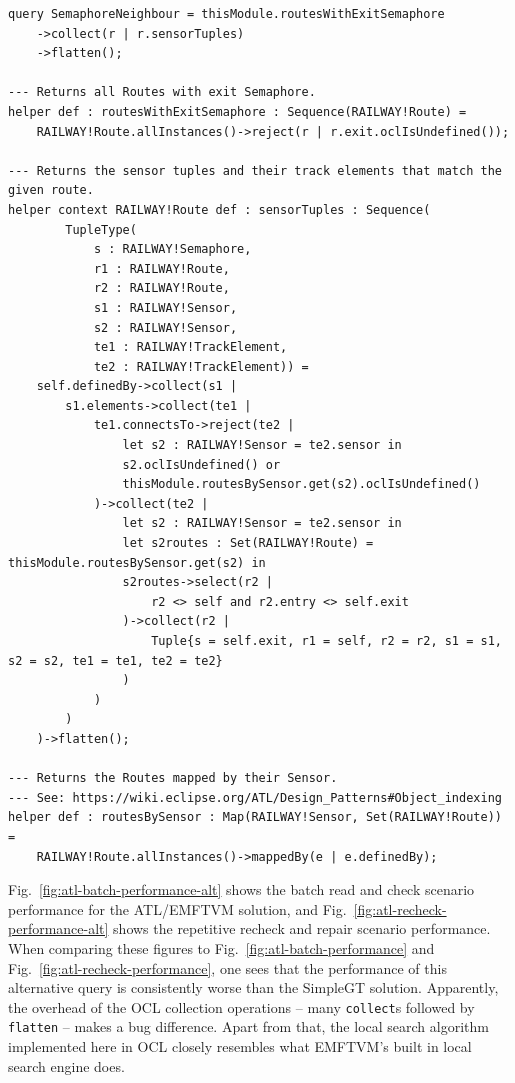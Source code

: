 \documentclass[submission,copyright,creativecommons]{eptcs}
\begin{document}
\lstset{language=atl}
\begin{lstlisting}[float=htb, caption={SemaphoreNeighbor query in ATL}, label=lst:semaphoreneighbor, captionpos=b, frame=tb, belowskip=-10pt]
query SemaphoreNeighbour = thisModule.routesWithExitSemaphore
	->collect(r | r.sensorTuples)
	->flatten();

--- Returns all Routes with exit Semaphore.
helper def : routesWithExitSemaphore : Sequence(RAILWAY!Route) =
	RAILWAY!Route.allInstances()->reject(r | r.exit.oclIsUndefined());

--- Returns the sensor tuples and their track elements that match the given route.
helper context RAILWAY!Route def : sensorTuples : Sequence(
		TupleType(
			s : RAILWAY!Semaphore,
			r1 : RAILWAY!Route,
			r2 : RAILWAY!Route,
			s1 : RAILWAY!Sensor,
			s2 : RAILWAY!Sensor,
			te1 : RAILWAY!TrackElement, 
			te2 : RAILWAY!TrackElement)) =
	self.definedBy->collect(s1 | 
		s1.elements->collect(te1 | 
			te1.connectsTo->reject(te2 | 
				let s2 : RAILWAY!Sensor = te2.sensor in
				s2.oclIsUndefined() or 
				thisModule.routesBySensor.get(s2).oclIsUndefined()
			)->collect(te2 |
				let s2 : RAILWAY!Sensor = te2.sensor in
				let s2routes : Set(RAILWAY!Route) = thisModule.routesBySensor.get(s2) in
				s2routes->select(r2 |
					r2 <> self and r2.entry <> self.exit
				)->collect(r2 |
					Tuple{s = self.exit, r1 = self, r2 = r2, s1 = s1, s2 = s2, te1 = te1, te2 = te2}
				)
			)
		)
	)->flatten();

--- Returns the Routes mapped by their Sensor.
--- See: https://wiki.eclipse.org/ATL/Design_Patterns#Object_indexing
helper def : routesBySensor : Map(RAILWAY!Sensor, Set(RAILWAY!Route)) =
	RAILWAY!Route.allInstances()->mappedBy(e | e.definedBy);
\end{lstlisting}

Fig.~\ref{fig:atl-batch-performance-alt} shows the batch read and check scenario performance for the ATL/EMFTVM solution, and Fig.~\ref{fig:atl-recheck-performance-alt} shows the repetitive recheck and repair scenario performance. When comparing these figures to Fig.~\ref{fig:atl-batch-performance} and Fig.~\ref{fig:atl-recheck-performance}, one sees that the performance of this alternative query is consistently worse than the SimpleGT solution. Apparently, the overhead of the OCL collection operations -- many \texttt{collect}s followed by \texttt{flatten} -- makes a bug difference. Apart from that, the local search algorithm implemented here in OCL closely resembles what EMFTVM's built in local search engine does.
\end{document}
